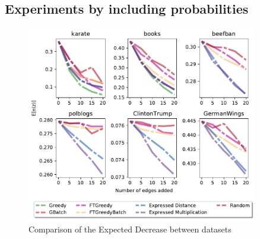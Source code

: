 \subsection{Experiments by including probabilities}
\label{probexperiment}

\begin{figure}[!htbp]
	\centering
	\captionsetup{justification=centering,margin=2cm}
	\includegraphics[width=0.90\textwidth]{Figures/embeddings_small}
	\caption{Comparison of the Expected Decrease between datasets}
	\label{fig:embeddings_smalll}
\end{figure}


\clearpage
